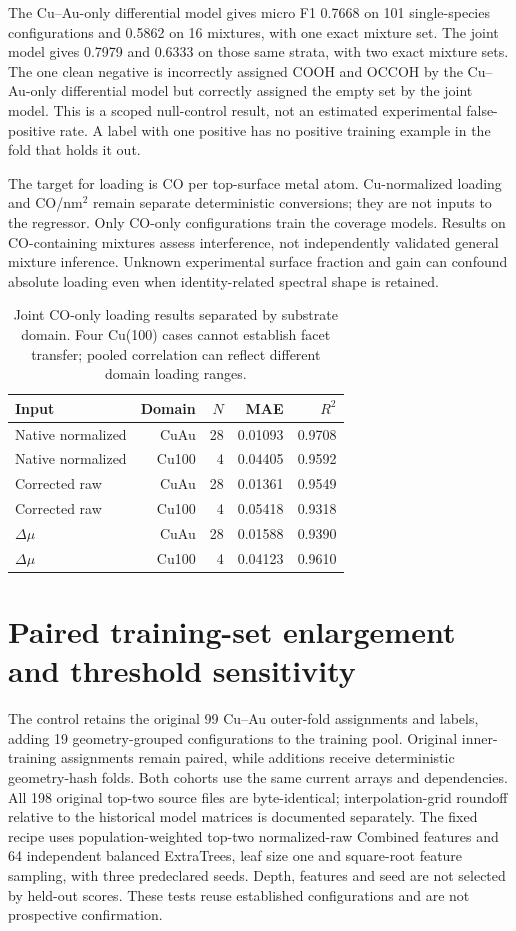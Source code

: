 The Cu--Au-only differential model gives micro F1 0.7668 on 101 single-species configurations and 0.5862 on 16 mixtures, with one exact mixture set. The joint model gives 0.7979 and 0.6333 on those same strata, with two exact mixture sets. The one clean negative is incorrectly assigned COOH and OCCOH by the Cu--Au-only differential model but correctly assigned the empty set by the joint model. This is a scoped null-control result, not an estimated experimental false-positive rate. A label with one positive has no positive training example in the fold that holds it out.

The target for loading is CO per top-surface metal atom. Cu-normalized loading and CO/nm$^2$ remain separate deterministic conversions; they are not inputs to the regressor. Only CO-only configurations train the coverage models. Results on CO-containing mixtures assess interference, not independently validated general mixture inference. Unknown experimental surface fraction and gain can confound absolute loading even when identity-related spectral shape is retained.
\begin{table}[!htbp]\centering\small
\caption{Joint CO-only loading results separated by substrate domain. Four Cu(100) cases cannot establish facet transfer; pooled correlation can reflect different domain loading ranges.}
\begin{tabular}{lrrrr}\toprule
Input & Domain & $N$ & MAE & $R^2$\\\midrule
Native normalized & CuAu & 28 & 0.01093 & 0.9708\\
Native normalized & Cu100 & 4 & 0.04405 & 0.9592\\
Corrected raw & CuAu & 28 & 0.01361 & 0.9549\\
Corrected raw & Cu100 & 4 & 0.05418 & 0.9318\\
$\Delta\mu$ & CuAu & 28 & 0.01588 & 0.9390\\
$\Delta\mu$ & Cu100 & 4 & 0.04123 & 0.9610\\
\bottomrule\end{tabular}\end{table}

\section{Paired training-set enlargement and threshold sensitivity}
The control retains the original 99 Cu--Au outer-fold assignments and labels, adding 19 geometry-grouped configurations to the training pool. Original inner-training assignments remain paired, while additions receive deterministic geometry-hash folds. Both cohorts use the same current arrays and dependencies. All 198 original top-two source files are byte-identical; interpolation-grid roundoff relative to the historical model matrices is documented separately. The fixed recipe uses population-weighted top-two normalized-raw Combined features and 64 independent balanced ExtraTrees, leaf size one and square-root feature sampling, with three predeclared seeds. Depth, features and seed are not selected by held-out scores. These tests reuse established configurations and are not prospective confirmation.

